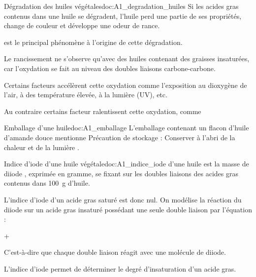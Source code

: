 \newpage
\vspace*{-30pt}


\begin{doc}{Dégradation des huiles végétales}{doc:A1_degradation_huiles}
  Si les acides gras contenus dans une huile se dégradent, l’huile perd une partie de ses propriétés, change de couleur et développe une odeur de rance.
  \begin{importants}  
     est le principal phénomène à l’origine de cette dégradation.
  \end{importants}
  Le rancissement ne s'observe qu'avec des huiles contenant des graisses insaturées, car l'oxydation se fait au niveau des doubles liaisons carbone-carbone.
  \begin{importants}  
    Certains facteurs accélèrent cette oxydation comme l’exposition au dioxygène de l’air, à des température élevée, à la lumière (UV), etc.
  \end{importants}
  \begin{importants}
    Au contraire certains facteur ralentissent cette oxydation, comme 
  \end{importants}
\end{doc}



\begin{doc}{Emballage d'une huile}{doc:A1_emballage}  
  L'emballage contenant un flacon d'huile d'amande douce mentionne \og Précaution de stockage : Conserver à l’abri de la chaleur et de la lumière \fg.
\end{doc}



\begin{doc}{Indice d’iode d’une huile végétale}{doc:A1_indice_iode}
   d'une huile est la masse de diiode , exprimée en gramme, se fixant sur les doubles liaisons des acides gras contenus dans \qty{100}{g} d’huile.
  
  L'indice d'iode d'un acide gras saturé est donc nul.
  On modélise la réaction du diiode  sur un acide gras insaturé possédant une seule double liaison par l’équation :
  \begin{center}
     +  \reaction {}
  \end{center}
  C'est-à-dire que chaque double liaison réagit avec une molécule de diiode.

  \begin{importants}
    L'indice d'iode permet de déterminer le degré d'insaturation d'un acide gras.
  \end{importants}
\end{doc}

